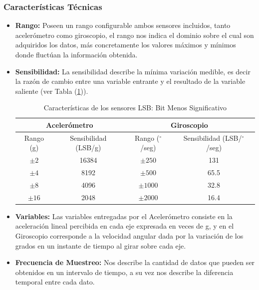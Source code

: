 \documentclass[12pt,a4paper]{article}
\newcommand{\grad}{$^{\circ}$}
\begin{document}
\newpage
\subsubsection{Características Técnicas}

\begin{itemize}
	
	\item \textbf{Rango:} Poseen un rango configurable ambos sensores incluidos, tanto acelerómetro como giroscopio, el rango nos indica el dominio sobre el cual son adquiridos los datos, más concretamente los valores máximos y mínimos donde fluctúan la información obtenida.
	
	\item \textbf{Sensibilidad:} La sensibilidad describe la mínima variación medible, es decir la razón de cambio entre una variable entrante y el resultado de la variable saliente (ver Tabla (\ref{table:caracteristicasSensor})).
	
	\begin{table}[H]
		\centering
		\begin{tabular}{|c|c|c|c|}
			\hline
			\multicolumn{2}{|c|}{Acelerómetro} &\multicolumn{2}{|c|}{Giroscopio}   \\
			\hline
			Rango (g)        & Sensibilidad (LSB/g)  & Rango (\grad/seg)     & Sensibilidad (LSB/\grad/seg)\\ \hline
			$\pm 2$     &  16384 & $\pm 250 $  	& 	131      	\\ 
			$\pm 4$     &  8192  & $\pm 500 $ 	& 	65.5     	\\
			$\pm 8$     &  4096  & $\pm 1000$  	& 	32.8       	\\
			$\pm 16$    &  2048  & $\pm 2000$   & 	16.4      	\\ 
			\hline
		\end{tabular}
		\caption{Características de los sensores LSB: Bit Menos Significativo}
		\label{table:caracteristicasSensor}
	\end{table}
	
	\item \textbf{Variables:} Las variables entregadas por el Acelerómetro consiste en la aceleración lineal percibida en cada eje expresada en veces de g, y en el Giroscopio corresponde  a la velocidad angular dada por la variación de los grados en un instante de tiempo al girar sobre cada eje.
	
	\item \textbf{Frecuencia de Muestreo:} Nos describe la cantidad de datos que pueden ser obtenidos en un intervalo de tiempo, a su vez nos describe la diferencia temporal entre cada dato.
	

\end{itemize}
\end{document}
